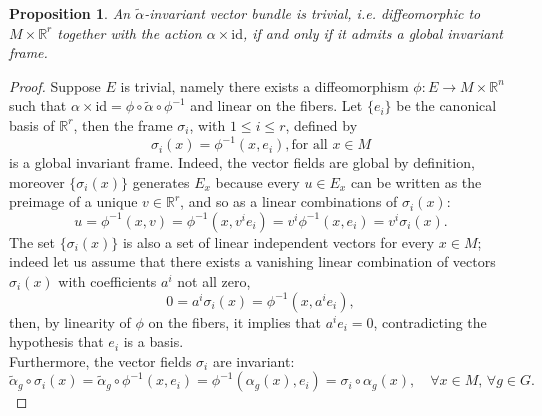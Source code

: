 \documentclass{article}
\numberwithin{equation}{section}
\newtheorem{proposition}[theorem]{Proposition}
\theoremstyle{definition}
\newcommand{\R}{\mathbb{R}}
\begin{document}
\begin{proposition}
    An $\tilde\alpha$-invariant vector bundle is trivial, i.e. diffeomorphic to $M\times\R^r$ together with the action $\alpha\times\mathrm{id}$, if and only if it admits a global invariant frame.
\end{proposition}
\begin{proof}
    Suppose $E$ is trivial, namely there exists a diffeomorphism $\phi:E\to M\times \R^n$ such that $\alpha\times\mathrm{id}=\phi\circ \tilde\alpha\circ \phi^{-1}$ and linear on the fibers. Let $\{e_i\}$ be the canonical basis of $\R^r$, then the frame $\sigma_i$, with $1\leq i\leq r$, defined by 
    \begin{equation*}
        \sigma_i(x)=\phi^{-1}(x,e_i), \text{for all } x \in M
    \end{equation*}
    is a global invariant frame. Indeed, the vector fields are global by definition, moreover $\{\sigma_i(x)\}$ generates $E_x$ because every $u\in E_x$ can be written as the preimage of a unique $v\in \R^r$, and so as a linear combinations of $\sigma_i(x)$:
    \begin{equation}
        u=\phi^{-1}(x,v)=\phi^{-1}(x,v^ie_i)=v^i\phi^{-1}(x,e_i)=v^i\sigma_i(x).
    \end{equation}
    The set $\{\sigma_i(x)\}$ is also a set of linear independent vectors for every $x\in M$; indeed let us assume that there exists a vanishing linear combination of vectors $\sigma_i(x)$ with coefficients $a^i$ not all zero,
    \begin{equation}
        0=a^i\sigma_i(x)=\phi^{-1}(x,a^ie_i),
    \end{equation}
    then, by linearity of $\phi$ on the fibers, it implies that $a^ie_i=0$, contradicting the hypothesis that $e_i$ is a basis.\\
    Furthermore, the vector fields $\sigma_i$ are invariant:
\begin{equation*}
    \tilde \alpha_g \circ\sigma_i(x)=\tilde\alpha_g\circ \phi^{-1}(x,e_i)=\phi^{-1}(\alpha_g(x),e_i)=\sigma_i\circ \alpha_g(x), \quad \forall x\in M,\,\forall g \in G.
\end{equation*}


\end{proof}
\end{document}
